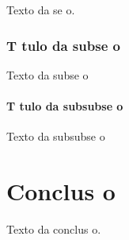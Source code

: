 \documentclass{article}
\begin{document}
Texto da se o.

\subsection{T tulo da subse o}

Texto da subse o

\subsubsection{T tulo da subsubse o}

Texto da subsubse o

\chapter*{Conclus o}

Texto da conclus o.









\end{document}
